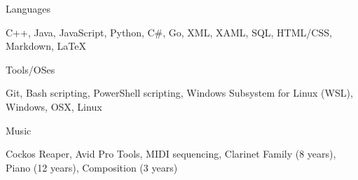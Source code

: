 \documentclass[]{awesome-cv}
\begin{document}
\vspace{-2mm}
	\cventry
	{}
	{Languages}
	{}
	{}
	{\begin{cvitems}
		\vspace{-7mm}
		\item {C++, Java, JavaScript, Python, C\#, Go, XML, XAML, SQL, HTML/CSS, Markdown, LaTeX}
		\end{cvitems}}

	\vspace{-8mm}
	\cventry
	{}
	{Tools/OSes}
	{}
	{}
	{\begin{cvitems}
		\vspace{-7mm}
		\item {Git, Bash scripting, PowerShell scripting, Windows Subsystem for Linux (WSL), Windows, OSX, Linux}
		\end{cvitems}}
	
	\vspace{-8mm}
	\cventry
	{}
	{Music}
	{}
	{}
	{\begin{cvitems}
		\vspace{-7mm}
		\item {Cockos Reaper, Avid Pro Tools, MIDI sequencing, Clarinet Family (8 years), Piano (12 years), Composition (3 years)}
		\end{cvitems}}
	\vspace{-4mm}
\end{document}
